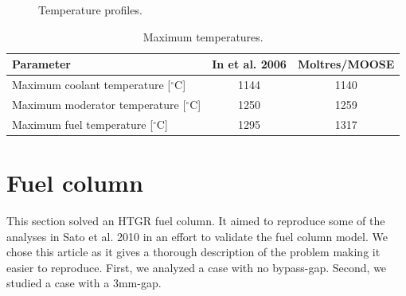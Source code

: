 \begin{figure}[htbp!]
  \centering
  \hfill
  \caption{Temperature profiles.}
  \label{fig:th-val-unit-temps}
\end{figure}

\begin{table}[htbp!]
\centering
    \caption{Maximum temperatures.}
    \label{tab:th-val-unit-results}
    \begin{tabular}{@{}l c c}
    \toprule
  Parameter   & In et al. 2006 \cite{in_three-dimensional_2006} & Moltres/MOOSE \\
    \midrule
  Maximum coolant temperature [$^{\circ}$C]   & 1144 & 1140 \\
  Maximum moderator temperature [$^{\circ}$C] & 1250 & 1259 \\
  Maximum fuel temperature [$^{\circ}$C]      & 1295 & 1317 \\
    \bottomrule
  \end{tabular}
\end{table}

\section{Fuel column}

This section solved an HTGR fuel column.
It aimed to reproduce some of the analyses in Sato et al. 2010 \cite{sato_computational_2010} in an effort to validate the fuel column model.
We chose this article as it gives a thorough description of the problem making it easier to reproduce.
First, we analyzed a case with no bypass-gap.
Second, we studied a case with a 3mm-gap.

